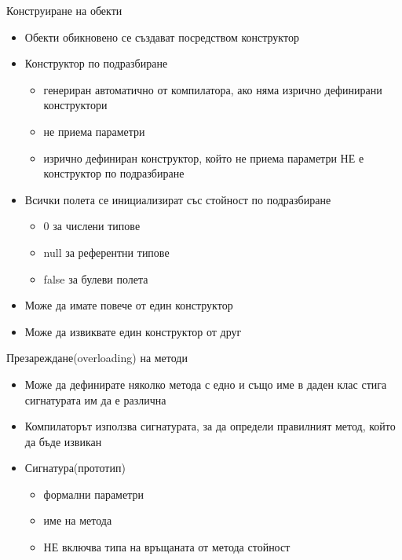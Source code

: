 \documentclass{beamer}
\begin{document}
\begin{frame}{Конструиране на обекти}
  \transdissolve
  \begin{itemize}
  \item Обекти обикновено се създават посредством конструктор \pause
  \item Конструктор по подразбиране
    \begin{itemize}
      \item генериран автоматично от компилатора, ако няма изрично
        дефинирани конструктори
      \item не приема параметри
      \item изрично дефиниран конструктор, който не приема параметри
        \alert{НЕ} е конструктор по подразбиране
    \end{itemize}
 \pause
  \item Всички полета се инициализират със стойност по подразбиране
    \begin{itemize}
    \item 0 за числени типове
    \item null за референтни типове
    \item false за булеви полета
    \end{itemize} \pause
  \item Може да имате повече от един конструктор \pause
  \item Може да извиквате един конструктор от друг
  \end{itemize}
\end{frame}

\begin{frame}{Презареждане(overloading) на методи}
  \transdissolve
  \begin{itemize}
  \item Може да дефинирате няколко метода с едно и също име в даден
    клас стига сигнатурата им да е различна \pause
  \item Компилаторът използва сигнатурата, за да определи правилният
    метод, който да бъде извикан \pause
  \item Сигнатура(прототип)
    \begin{itemize}
    \item формални параметри
    \item име на метода
    \item \alert{НЕ} включва типа на връщаната от метода стойност
    \end{itemize}
  \end{itemize}
\end{frame}
\end{document}
